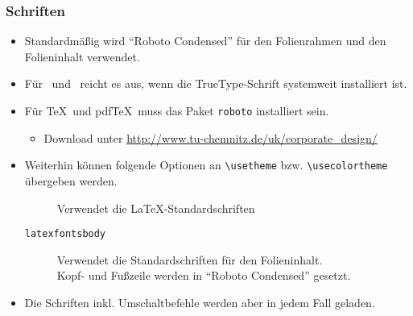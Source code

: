 \begin{frame}[containsverbatim]
\frametitle{Schriften}

\begin{itemize}
\item Standardmäßig wird "`Roboto Condensed"' für den Folienrahmen
      und den Folieninhalt verwendet.
\item Für \XeTeX\ und \LuaTeX\ reicht es aus, wenn die TrueType-Schrift
      systemweit installiert ist.
\item Für \TeX\ und pdf\TeX\ muss das Paket \texttt{roboto} installiert sein.
  \begin{itemize}
  \item Download unter \url{http://www.tu-chemnitz.de/uk/corporate_design/}
  \end{itemize}

\bigskip

\item Weiterhin können folgende Optionen an
      \lstinline[language={[LaTeX]TeX}]{\usetheme} bzw.
      \lstinline[language={[LaTeX]TeX}]{\usecolortheme} übergeben werden.
  \begin{description}
  \item[]
         Verwendet die \LaTeX-Standardschriften
  \item[\texttt{latexfontsbody}]
         Verwendet die Standardschriften für den Folieninhalt. \\
         Kopf- und Fußzeile werden in "`Roboto Condensed"' gesetzt.
  \end{description}
\item Die Schriften inkl. Umschaltbefehle werden aber in jedem Fall geladen.
\end{itemize}
\end{frame}
